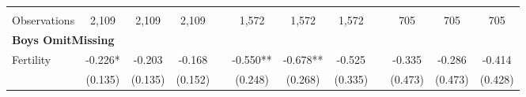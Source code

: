 \begin{landscape}
\begin{table}[htpb!]
\begin{center}
\begin{tabular}{lcccp{2mm}cccp{2mm}ccc}
\begin{footnotesize}\end{footnotesize}&\begin{footnotesize}\end{footnotesize}&\begin{footnotesize}\end{footnotesize}&\begin{footnotesize}\end{footnotesize}&\begin{footnotesize}\end{footnotesize}&\begin{footnotesize}\end{footnotesize}&\begin{footnotesize}\end{footnotesize}&\begin{footnotesize}\end{footnotesize}&\begin{footnotesize}\end{footnotesize}&\begin{footnotesize}\end{footnotesize}&\begin{footnotesize}\end{footnotesize}&\begin{footnotesize}\end{footnotesize}\\Observations&2,109&2,109&2,109&&1,572&1,572&1,572&&705&705&705\\
\multicolumn{12}{l}{\textbf{Boys OmitMissing}}\\ 
Fertility&-0.226*&-0.203&-0.168&&-0.550**&-0.678**&-0.525&&-0.335&-0.286&-0.414\\
&(0.135)&(0.135)&(0.152)&&(0.248)&(0.268)&(0.335)&&(0.473)&(0.473)&(0.428)\\

\end{tabular}
\end{center}
\end{table}
\end{landscape}
